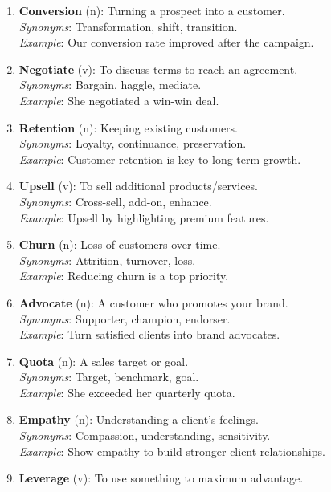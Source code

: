 \documentclass[11pt, a4paper]{article}
\begin{document}
\begin{enumerate}[label=\arabic*.]
    \item \textbf{Conversion} (n): Turning a prospect into a customer. \\
          \textit{Synonyms}: Transformation, shift, transition. \\
          \textit{Example}: Our conversion rate improved after the campaign.
    \item \textbf{Negotiate} (v): To discuss terms to reach an agreement. \\
          \textit{Synonyms}: Bargain, haggle, mediate. \\
          \textit{Example}: She negotiated a win-win deal.
    \item \textbf{Retention} (n): Keeping existing customers. \\
          \textit{Synonyms}: Loyalty, continuance, preservation. \\
          \textit{Example}: Customer retention is key to long-term growth.
    \item \textbf{Upsell} (v): To sell additional products/services. \\
          \textit{Synonyms}: Cross-sell, add-on, enhance. \\
          \textit{Example}: Upsell by highlighting premium features.
    \item \textbf{Churn} (n): Loss of customers over time. \\
          \textit{Synonyms}: Attrition, turnover, loss. \\
          \textit{Example}: Reducing churn is a top priority.
    \item \textbf{Advocate} (n): A customer who promotes your brand. \\
          \textit{Synonyms}: Supporter, champion, endorser. \\
          \textit{Example}: Turn satisfied clients into brand advocates.
    \item \textbf{Quota} (n): A sales target or goal. \\
          \textit{Synonyms}: Target, benchmark, goal. \\
          \textit{Example}: She exceeded her quarterly quota.
    \item \textbf{Empathy} (n): Understanding a client’s feelings. \\
          \textit{Synonyms}: Compassion, understanding, sensitivity. \\
          \textit{Example}: Show empathy to build stronger client relationships.
    \item \textbf{Leverage} (v): To use something to maximum advantage. \\

\end{enumerate}
\end{document}
